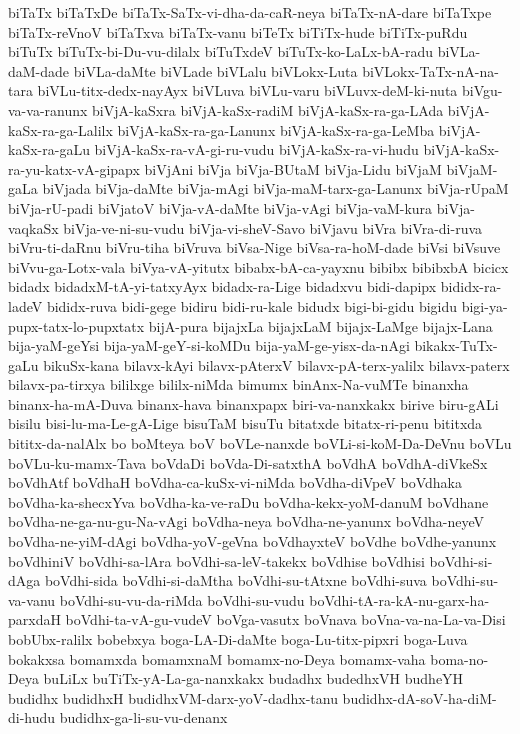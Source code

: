 {biTaTx
biTaTxDe
biTaTx-SaTx-vi-dha-da-caR-neya
biTaTx-nA-dare
biTaTxpe
biTaTx-reVnoV
biTaTxva
biTaTx-vanu
biTeTx
biTiTx-hude
biTiTx-puRdu
biTuTx
biTuTx-bi-Du-vu-dilalx
biTuTxdeV
biTuTx-ko-LaLx-bA-radu
biVLa-daM-dade
biVLa-daMte
biVLade
biVLalu
biVLokx-Luta
biVLokx-TaTx-nA-na-tara
biVLu-titx-dedx-nayAyx
biVLuva
biVLu-varu
biVLuvx-deM-ki-nuta
biVgu-va-va-ranunx
biVjA-kaSxra
biVjA-kaSx-radiM
biVjA-kaSx-ra-ga-LAda
biVjA-kaSx-ra-ga-Lalilx
biVjA-kaSx-ra-ga-Lanunx
biVjA-kaSx-ra-ga-LeMba
biVjA-kaSx-ra-gaLu
biVjA-kaSx-ra-vA-gi-ru-vudu
biVjA-kaSx-ra-vi-hudu
biVjA-kaSx-ra-yu-katx-vA-gipapx
biVjAni
biVja
biVja-BUtaM
biVja-Lidu
biVjaM
biVjaM-gaLa
biVjada
biVja-daMte
biVja-mAgi
biVja-maM-tarx-ga-Lanunx
biVja-rUpaM
biVja-rU-padi
biVjatoV
biVja-vA-daMte
biVja-vAgi
biVja-vaM-kura
biVja-vaqkaSx
biVja-ve-ni-su-vudu
biVja-vi-sheV-Savo
biVjavu
biVra
biVra-di-ruva
biVru-ti-daRnu
biVru-tiha
biVruva
biVsa-Nige
biVsa-ra-hoM-dade
biVsi
biVsuve
biVvu-ga-Lotx-vala
biVya-vA-yitutx
bibabx-bA-ca-yayxnu
bibibx
bibibxbA
bicicx
bidadx
bidadxM-tA-yi-tatxyAyx
bidadx-ra-Lige
bidadxvu
bidi-dapipx
bididx-ra-ladeV
bididx-ruva
bidi-gege
bidiru
bidi-ru-kale
bidudx
bigi-bi-gidu
bigidu
bigi-ya-pupx-tatx-lo-pupxtatx
bijA-pura
bijajxLa
bijajxLaM
bijajx-LaMge
bijajx-Lana
bija-yaM-geYsi
bija-yaM-geY-si-koMDu
bija-yaM-ge-yisx-da-nAgi
bikakx-TuTx-gaLu
bikuSx-kana
bilavx-kAyi
bilavx-pAterxV
bilavx-pA-terx-yalilx
bilavx-paterx
bilavx-pa-tirxya
bililxge
bililx-niMda
bimumx
binAnx-Na-vuMTe
binanxha
binanx-ha-mA-Duva
binanx-hava
binanxpapx
biri-va-nanxkakx
birive
biru-gALi
bisilu
bisi-lu-ma-Le-gA-Lige
bisuTaM
bisuTu
bitatxde
bitatx-ri-penu
bititxda
bititx-da-nalAlx
bo
boMteya
boV
boVLe-nanxde
boVLi-si-koM-Da-DeVnu
boVLu
boVLu-ku-mamx-Tava
boVdaDi
boVda-Di-satxthA
boVdhA
boVdhA-diVkeSx
boVdhAtf
boVdhaH
boVdha-ca-kuSx-vi-niMda
boVdha-diVpeV
boVdhaka
boVdha-ka-shecxYva
boVdha-ka-ve-raDu
boVdha-kekx-yoM-danuM
boVdhane
boVdha-ne-ga-nu-gu-Na-vAgi
boVdha-neya
boVdha-ne-yanunx
boVdha-neyeV
boVdha-ne-yiM-dAgi
boVdha-yoV-geVna
boVdhayxteV
boVdhe
boVdhe-yanunx
boVdhiniV
boVdhi-sa-lAra
boVdhi-sa-leV-takekx
boVdhise
boVdhisi
boVdhi-si-dAga
boVdhi-sida
boVdhi-si-daMtha
boVdhi-su-tAtxne
boVdhi-suva
boVdhi-su-va-vanu
boVdhi-su-vu-da-riMda
boVdhi-su-vudu
boVdhi-tA-ra-kA-nu-garx-ha-parxdaH
boVdhi-ta-vA-gu-vudeV
boVga-vasutx
boVnava
boVna-va-na-La-va-Disi
bobUbx-ralilx
bobebxya
boga-LA-Di-daMte
boga-Lu-titx-pipxri
boga-Luva
bokakxsa
bomamxda
bomamxnaM
bomamx-no-Deya
bomamx-vaha
boma-no-Deya
buLiLx
buTiTx-yA-La-ga-nanxkakx
budadhx
budedhxVH
budheYH
budidhx
budidhxH
budidhxVM-darx-yoV-dadhx-tanu
budidhx-dA-soV-ha-diM-di-hudu
budidhx-ga-li-su-vu-denanx
}
